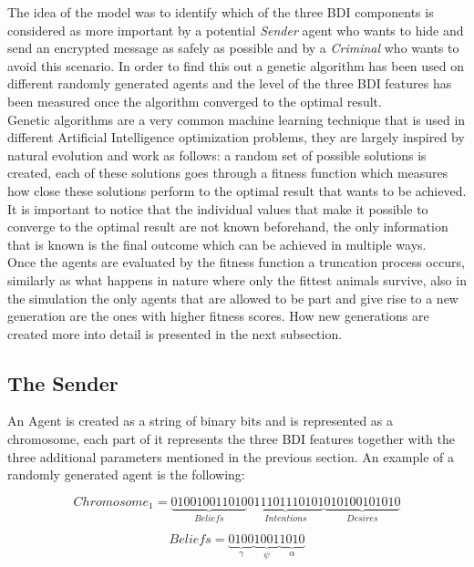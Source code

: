 \documentclass[a4paper]{article}
\begin{document}
The idea of the model was to identify which of the three BDI components is considered as more important by a potential \textit{Sender} agent who wants to hide and send an encrypted message as safely as possible and by a \textit{Criminal} who wants to avoid this scenario. In order to find this out a genetic algorithm has been used on different randomly generated agents and the level of the three BDI features has been measured once the algorithm converged to the optimal result. \\
Genetic algorithms are a very common machine learning technique that is used in different Artificial Intelligence optimization problems, they are largely inspired by natural evolution and work as follows: a random set of possible solutions is created, each of these solutions goes through a fitness function which measures how close these solutions perform to the optimal result that wants to be achieved. It is important to notice that the individual values that make it possible to converge to the optimal result are not known beforehand, the only information that is known is the final outcome which can be achieved in multiple ways.\\
Once the agents are evaluated by the fitness function a truncation process occurs, similarly as what happens in nature where only the fittest animals survive, also in the simulation the only agents that are allowed to be part and give rise to a new generation are the ones with higher fitness scores. How new generations are created more into detail is presented in the next subsection.


\subsection{The Sender}

An Agent is created as a string of binary bits and is represented as a chromosome, each part of it represents the three BDI features together with the three additional parameters mentioned in the previous section. An example of a randomly generated agent is the following:

\begin{equation}
	Chromosome_1 = \underbrace{010010011010}_{Beliefs}\underbrace{011101110101}_{Intentions}\underbrace{010100101010}_{Desires}
\end{equation}

\begin{equation}
	Beliefs = \underbrace{0100}_{\gamma} \underbrace{1001}_{\psi} \underbrace{1010}_{\alpha} 
\end{equation}  
\end{document}

